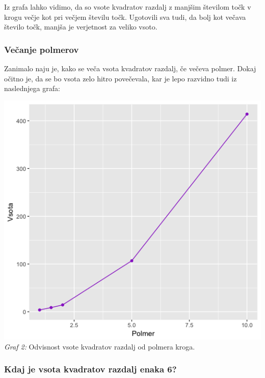\documentclass[a4paper]{report}
\begin{document}
Iz grafa lahko vidimo, da so vsote kvadratov razdalj z manjšim številom točk v krogu večje kot pri večjem številu točk. Ugotovili sva tudi, da bolj kot večava število točk, manjša je verjetnost za veliko vsoto. \\ 
\subsubsection{Večanje polmerov}

Zanimalo naju je, kako se veča vsota kvadratov razdalj, če večeva polmer. Dokaj očitno je, da se bo vsota zelo hitro povečevala, kar je lepo razvidno tudi iz naslednjega grafa:
\begin{center}
\includegraphics[scale = 0.3]{krog_polmer}\\ 
\scriptsize{\textit{Graf 2: } Odvisnost vsote kvadratov razdalj od polmera kroga.}
\end{center}

\subsubsection{Kdaj je vsota kvadratov razdalj enaka 6?}
\end{document}

